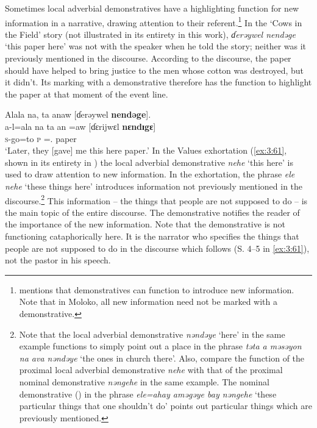 Sometimes local adverbial demonstratives have a highlighting function for new information in a narrative, drawing attention to their referent.\footnote{\citet{Dixon2003} mentions that demonstratives can function to introduce new information. Note that in Moloko, all new information need not be marked with a demonstrative.} In the ‘Cows in the Field’ story (not illustrated in its entirety in this work), \textit{ɗerəywel nendəge} ‘this paper here’  was not with the speaker when he told the story; neither was it previously mentioned in the discourse. According to the discourse, the paper should have helped to bring justice to the men whose cotton was destroyed, but it didn’t. Its marking with a demonstrative therefore has the function to highlight the paper at that moment of the event line. 

\ea \label{ex:3:60}
Alala  na,  ta  anaw  [ɗerəywel  \textbf{nendəge}].\\
\gll  a-l=ala  na      ta   an  =aw   [ɗɛrijwɛl   \textbf{nɛndɪgɛ}]\\
      \textsc{s}-go=to  {\PSP}   \textsc{p}  {\DAT}  ={\oneS}.{\IO}  paper        {\DEM}\\
\glt  ‘Later, they [gave] me this here paper.’ 
\z
In the Values exhortation (\ref{ex:3:61}, shown in its entirety in ) the local adverbial demonstrative \textit{nehe}  ‘this here’ is used to draw attention to new information. In the exhortation, the phrase \textit{ele nehe}  ‘these things here’ introduces information not previously mentioned in the discourse.\footnote{Note that the local adverbial demonstrative \textit{nəndəye} ‘here’ in the same example functions to simply point out a place in the phrase \textit{təta a məsəyon na ava nəndəye} ‘the ones in church there’. Also, compare the function of the proximal local adverbial demonstrative \textit{nehe}  with that of the proximal nominal demonstrative \textit{nəngehe}  in the same example. The nominal demonstrative () in the phrase \textit{ele=ahay aməgəye bay nəngehe} ‘these particular things that one shouldn’t do’ points out particular things which are previously mentioned.} This information -- the things that people are not supposed to do -- is the main topic of the entire discourse. The demonstrative notifies the reader of the importance of the new information. Note that the demonstrative is not functioning cataphorically here. It is the narrator who specifies the things that people are not supposed to do in the discourse which follows (S. 4--5 in \ref{ex:3:61}), not the pastor in his speech. 


